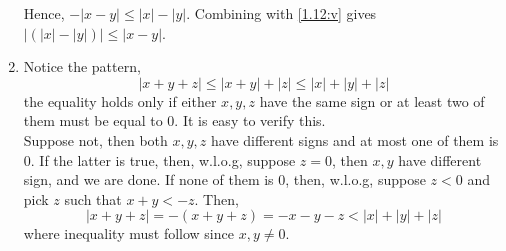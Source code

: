 \begin{solution}
\begin{enumerate}[label=(\roman*)]
    Hence, $-|x-y|\leq|x|-|y|$. Combining with \ref{1.12:v}
    gives $|(|x|-|y|)|\leq|x-y|$.
    \item Notice the pattern,
    \begin{equation*}
      |x+y+z|\leq|x+y|+|z|\leq|x|+|y|+|z|
    \end{equation*}
    the equality holds only if either $x,y,z$ have the same
    sign or at least two of them must be equal to $0$.
    It is easy to verify this.\\
    Suppose not, then both $x,y,z$ have different signs and
    at most one of them is $0$. If the latter is true,
    then, w.l.o.g, suppose $z=0$, then $x,y$ have different
    sign, and we are done. If none of them is $0$, then,
    w.l.o.g, suppose $z<0$ and pick $z$ such that
    $x+y<-z$. Then,
    \begin{equation*}
      |x+y+z|=-(x+y+z)=-x-y-z<|x|+|y|+|z|
    \end{equation*}
    where inequality must follow since $x,y\neq0$.
  \end{enumerate}
\end{solution}
